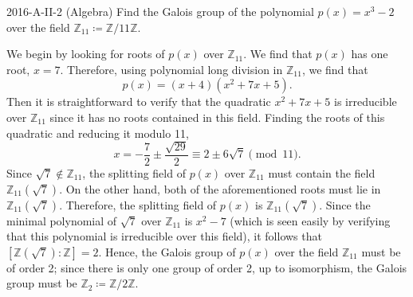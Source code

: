 \documentclass{article}
\begin{document}
\begin{prb}{2016-A-II-2 (Algebra)}
	Find the Galois group of the polynomial $p(x) = x^{3} - 2$ over the field $\mathbb{Z}_{11} \coloneqq \mathbb{Z}/11\mathbb{Z}$. 
\end{prb}
\begin{solutions}
	We begin by looking for roots of $p(x)$ over $\mathbb{Z}_{11}$. We find that $p(x)$ has one root, $x = 7$. Therefore, using polynomial long division in $\mathbb{Z}_{11}$, we find that 
		\begin{equation}
			p(x) = (x + 4)(x^{2} + 7x + 5). 
		\end{equation}
	Then it is straightforward to verify that the quadratic $x^{2} + 7x + 5$ is irreducible over $\mathbb{Z}_{11}$ since it has no roots contained in this field. Finding the roots of this quadratic and reducing it modulo 11, 
		\begin{equation}
			x = -\frac{7}{2} \pm \frac{\sqrt{29}}{2} \equiv 2 \pm 6\sqrt{7} \pmod{11}. 
		\end{equation}
	Since $\sqrt{7} \notin \mathbb{Z}_{11}$, the splitting field of $p(x)$ over $\mathbb{Z}_{11}$ must contain the field $\mathbb{Z}_{11}(\sqrt{7})$. On the other hand, both of the aforementioned roots must lie in $\mathbb{Z}_{11}(\sqrt{7})$. Therefore, the splitting field of $p(x)$ is $\mathbb{Z}_{11}(\sqrt{7})$. Since the minimal polynomial of $\sqrt{7}$ over $\mathbb{Z}_{11}$ is $x^{2} - 7$ (which is seen easily by verifying that this polynomial is irreducible over this field), it follows that $[\mathbb{Z}(\sqrt{7}): \mathbb{Z}] = 2$. Hence, the Galois group of $p(x)$ over the field $\mathbb{Z}_{11}$ must be of order 2; since there is only one group of order 2, up to isomorphism, the Galois group must be $\mathbb{Z}_{2} \coloneqq \mathbb{Z}/2\mathbb{Z}$. 
\end{solutions}
\end{document}
